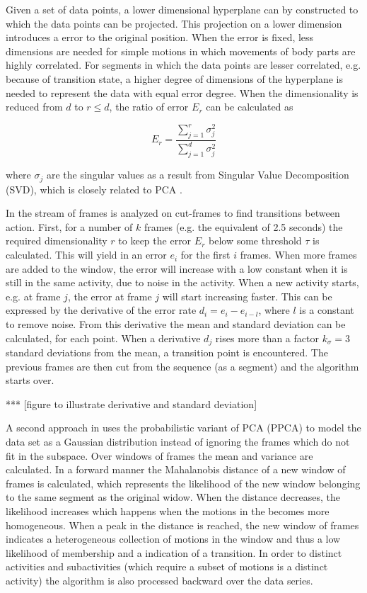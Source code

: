 Given a set of data points, a lower dimensional hyperplane can by constructed
to which the data points can be projected. This projection on a lower
dimension introduces a error to the original position. When the error is
fixed, less dimensions are needed for simple motions in which movements of
body parts are highly correlated. For segments in which the data points are
lesser correlated, e.g. because of transition state, a higher degree of
dimensions of the hyperplane is needed to represent the data with equal error
degree. When the dimensionality is reduced from $d$ to $r \le d$, the ratio of
error
$E_r$ can be calculated as

\begin{equation}
	E_r = \frac{\sum_{j=1}^{r} \sigma_j^2}{\sum_{j=1}^{d} \sigma_j^2}
\end{equation}

where $\sigma_j$ are the singular values as a result from Singular Value
Decomposition (SVD), which is closely related to PCA \cite{shlens2005tutorial}.

In \cite{barbivc2004segmenting} the stream of frames is analyzed on cut-frames
to find transitions between action. First, for a number of $k$ frames (e.g.
the
equivalent of 2.5 seconds) the required dimensionality $r$ to keep the error
$E_r$
below some threshold $\tau$ is calculated. This will yield in an error $e_i$
for the first
$i$ frames. When more frames are added to the window, the error will increase
with a low constant when it is still in the same activity, due to noise in the
activity. When a new activity
starts, e.g. at frame $j$, the error at frame $j$ will start increasing
faster. This can be expressed by the derivative of the error rate $d_i = e_i -
e_{i-l}$, where $l$ is a constant to remove noise. From this derivative the
mean and standard deviation can be calculated, for each point. When a
derivative $d_j$ rises more than a factor $k_\sigma = 3$ standard deviations
from the mean, a transition point is encountered. The previous frames are then
cut from the sequence (as a segment) and the algorithm starts over.

*** [figure to illustrate derivative and standard deviation]

A second approach in \cite{barbivc2004segmenting} uses the probabilistic
variant of PCA (PPCA) to model the data set as a Gaussian distribution instead
of ignoring the frames which do not fit in the subspace. Over windows of
frames the mean and variance are calculated. In a forward manner the
Mahalanobis distance of a new window of frames is calculated, which represents
the likelihood of the new window belonging to the same segment as the original
widow. When the distance decreases, the likelihood increases which happens
when the motions in the becomes more homogeneous. When a peak in the distance
is reached, the new window of frames indicates a heterogeneous collection of
motions in the window and thus a low likelihood of membership and a indication
of a transition. In order to distinct activities and subactivities (which
require a subset of motions is a distinct activity) the algorithm is also
processed backward over the data series.

